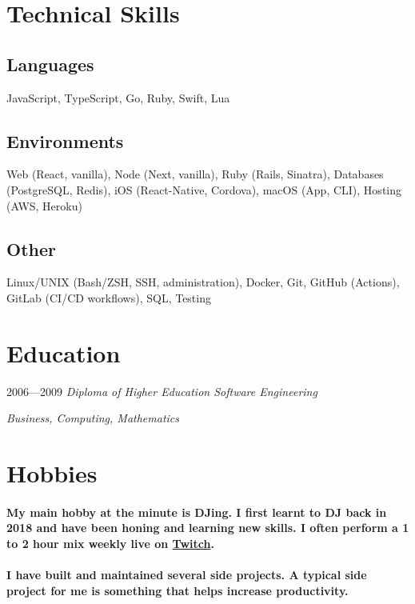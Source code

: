 \section{Technical Skills}

\subsection{Languages} JavaScript, TypeScript, Go, Ruby, Swift, Lua

\subsection{Environments} Web (React, vanilla), Node (Next, vanilla), Ruby
(Rails, Sinatra), Databases (PostgreSQL, Redis), iOS (React-Native, Cordova),
macOS (App, CLI), Hosting (AWS, Heroku)

\subsection{Other} Linux/UNIX (Bash/ZSH, SSH, administration), Docker, Git,
GitHub (Actions), GitLab (CI/CD workflows), SQL, Testing

\clearpage

\section{Education}

{2006---2009}
\textit{Diploma of Higher Education Software Engineering}

\textit{Business, Computing, Mathematics}

\section{Hobbies}
\paragraph{My main hobby at the minute is DJing. I first learnt to DJ back in
2018 and have been honing and learning new skills. I often perform a 1 to 2 hour
mix weekly live on \href{https://twitch.tv/iamdjriff}{Twitch}.}

\paragraph{I have built and maintained several side projects. A typical side
project for me is something that helps increase productivity.}

